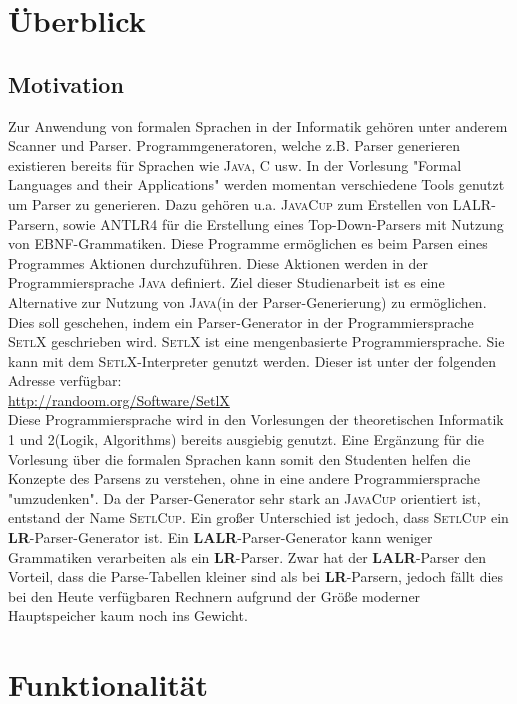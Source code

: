 \section{Überblick}
\subsection{Motivation}
Zur Anwendung von formalen Sprachen in der Informatik gehören unter anderem Scanner und Parser\cite{Aho86}. 
Programmgeneratoren, welche z.B. Parser generieren existieren bereits für Sprachen wie \textsc{Java}\cite{javacup:2016}, \textsc{C}\cite{donnelly1990} usw.
In der Vorlesung "Formal Languages and their Applications"\cite{stroetmann:formallanguages} werden momentan verschiedene Tools genutzt um Parser zu generieren. Dazu gehören u.a. \textsc{JavaCup} zum Erstellen von LALR-Parsern, sowie \textsc{ANTLR4}\cite{parr:2012} für die Erstellung eines Top-Down-Parsers mit Nutzung von EBNF-Grammatiken. Diese Programme ermöglichen es  beim Parsen eines Programmes Aktionen durchzuführen. Diese Aktionen werden in der Programmiersprache \textsc{Java} definiert.
Ziel dieser Studienarbeit ist es eine Alternative zur Nutzung von \textsc{Java}(in der Parser-Generierung) zu ermöglichen. Dies soll geschehen, indem ein Parser-Generator in der Programmiersprache \textsc{SetlX} geschrieben wird. \textsc{SetlX} ist eine mengenbasierte Programmiersprache. Sie kann mit dem \textsc{SetlX}-Interpreter genutzt werden. Dieser ist unter der folgenden Adresse verfügbar:\\
\href{http://randoom.org/Software/SetlX}{{http://randoom.org/Software/SetlX}}\\
Diese Programmiersprache wird in den Vorlesungen der theoretischen Informatik 1 und 2(Logik\cite{stroetmann:logic}, Algorithms\cite{stroetmann:algorithms}) bereits ausgiebig genutzt. Eine Ergänzung für die Vorlesung über die formalen Sprachen kann somit den Studenten helfen die Konzepte des Parsens zu verstehen, ohne in eine andere Programmiersprache "umzudenken". Da der Parser-Generator sehr stark an \textsc{JavaCup} orientiert ist, entstand der Name \textsc{SetlCup}. Ein großer Unterschied ist jedoch, dass \textsc{SetlCup} ein \textbf{LR}-Parser-Generator ist. Ein \textbf{LALR}-Parser-Generator kann weniger Grammatiken verarbeiten als ein \textbf{LR}-Parser. Zwar hat der \textbf{LALR}-Parser den Vorteil, dass die Parse-Tabellen kleiner sind als bei \textbf{LR}-Parsern, jedoch fällt dies bei den Heute verfügbaren Rechnern aufgrund der Größe moderner Hauptspeicher kaum noch ins Gewicht.
\section{Funktionalität}

